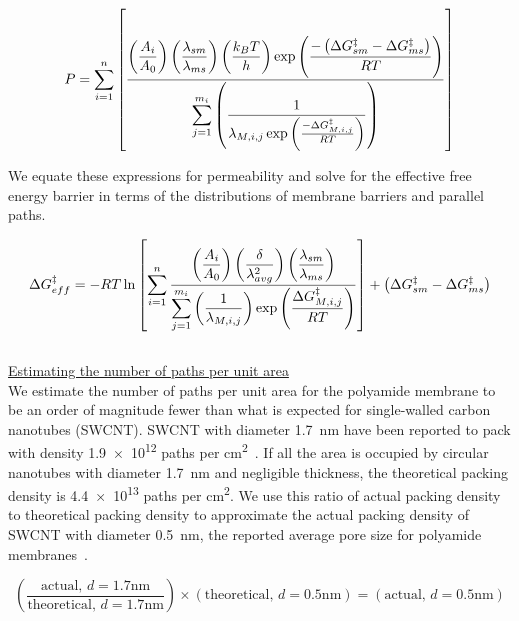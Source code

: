 \begin{equation}
    P = \sum_{i=1}^{n} \left[ \frac{\displaystyle \left( \frac{A_i}{A_0} \right) \left( \frac{\lambda_{sm}}{\lambda_{ms}} \right) \left( \frac{k_B T}{h} \right) \exp{\left( \frac{ -\left( \Delta G_{sm}^{\ddagger} - \Delta G_{ms}^{\ddagger} \right)}{R T} \right)}}{\displaystyle \sum_{j=1}^{m_i} \left( \frac{1}{\lambda_{M,i,j} \exp{\left( \frac{-\Delta G_{M,i,j}^{\ddagger}}{R T} \right)}} \right)} \right]
    \label{eq:SM_overall_permeability}
\end{equation}

\noindent We equate these expressions for permeability and solve for the effective free energy barrier in terms of the distributions of membrane barriers and parallel paths. 


\begin{equation}
    \Delta G_{eff}^{\ddagger} = -R T \ln{\left[ \sum_{i=1}^{n} \frac{ \displaystyle \left( \frac{A_i}{A_0} \right) \left( \frac{\delta}{\lambda_{avg}^2} \right) \left( \frac{\lambda_{sm}}{\lambda_{ms}} \right) }{\displaystyle \sum_{j=1}^{m_i} \left( \frac{1}{\lambda_{M,i,j}} \right) \exp{\left( \frac{\Delta G_{M,i,j}^{\ddagger}}{R T} \right)}} \right]} + \left( \Delta G_{sm}^{\ddagger} - \Delta G_{ms}^{\ddagger}\right)
    \label{eq:SM_effective_barrier}
\end{equation} \\

\noindent \underline{Estimating the number of paths per unit area} \\
We estimate the number of paths per unit area for the polyamide membrane to be an order of magnitude fewer than what is expected for single-walled carbon nanotubes (SWCNT). SWCNT with diameter 1.7~nm have been reported to pack with density \num{1.9e12} paths per \unit{\cm\squared}~\cite{jue_ultrapermeable_2020}. If all the area is occupied by circular nanotubes with diameter 1.7~nm and negligible thickness, the theoretical packing density is \num{4.4e13} paths per \unit{\cm\squared}. We use this ratio of actual packing density to theoretical packing density to approximate the actual packing density of SWCNT with diameter 0.5~nm, the reported average pore size for polyamide membranes~\cite{chu_variation_2021, wang_water_2023}. 

\begin{equation}
    \left( \frac{\text{actual, } d=1.7 \unit{\nm}}{\text{theoretical, } d=1.7 \unit{\nm}} \right) \times \left( \text{theoretical, } d=0.5 \unit{\nm} \right) = \left( \text{actual, } d=0.5 \unit{\nm} \right)
\end{equation}

